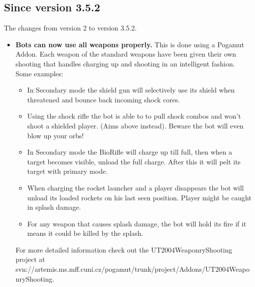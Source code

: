 \documentclass[11pt,a4paper]{article}
\begin{document}
\subsection{Since version 3.5.2} 


The changes from version 2 to version 3.5.2.

\begin{itemize}
	\item \textbf{Bots can now use all weapons properly.}
	This is done using a Pogamut Addon. Each weapon of the standard weapons have been given their own shooting that handles charging up and shooting in an intelligent fashion. Some examples: 
	\begin{itemize}


	\item In Secondary mode the shield gun will selectively use its shield when threatened and bounce back incoming shock cores. 
	\item Using the shock rifle the bot is able to to pull shock combos and won't shoot a shielded player. (Aims above instead).  Beware the bot will even blow up your orbs!
	\item In Secondary mode the BioRifle will charge up till full, then when a target becomes visible, unload the full charge. After this it will pelt its target with primary mode. 
	\item When charging the rocket launcher and a  player disappears the bot will unload its loaded rockets on his last seen position. Player might be caught in splash damage. 
	\item For any weapon that causes splash damage, the bot will hold its fire if it means it could be killed by the splash.
	\end{itemize}

For more detailed information check out the UT2004WeaponryShooting project at svn://artemis.ms.mff.cuni.cz/pogamut/trunk/project/Addons/UT2004WeaponryShooting.


\end{itemize}
\end{document}
